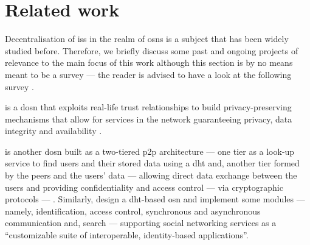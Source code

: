 
%
%
%
%

\section{Related work}
    \label{section:thesis:related-work}
Decentralisation of \acp{is} in the realm of \acp{osn} is a subject that has been 
widely studied before. Therefore, we briefly discuss some past and ongoing projects 
of relevance to the main focus of this work although this section is by no means 
meant to be a survey --- the reader is advised to have a look at the following 
survey \cite{PaulFS14}.

\Safebook is a \ac{dosn} that exploits real-life trust relationships to build privacy-preserving 
mechanisms that allow for services in the network guaranteeing privacy, data integrity 
and availability \cite{CutilloMS09}. 

\PeerSoN is another \ac{dosn} built as a two-tiered \ac{p2p} architecture --- one 
tier as a look-up service to find users and their stored data using a \ac{dht} and, 
another tier formed by the peers and the users' data --- allowing direct data exchange 
between the users and providing confidentiality and access control --- via cryptographic 
protocols --- \cite{BucheggerSVD09}. Similarly, \cite{AielloR10} design a \ac{dht}-based 
\ac{osn} and implement some modules --- namely, identification, access control, synchronous 
and asynchronous communication and, search --- supporting social networking services 
as a ``customizable suite of interoperable, identity-based applications''.

